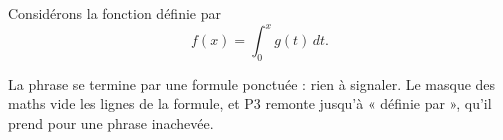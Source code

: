Considérons la fonction définie par
\[
  f(x) = \int_0^x g(t) \, dt.
\]
\begin{proposition}
  La phrase se termine par une formule ponctuée : rien à signaler. Le masque
  des maths vide les lignes de la formule, et P3 remonte jusqu'à « définie
  par », qu'il prend pour une phrase inachevée.
\end{proposition}
